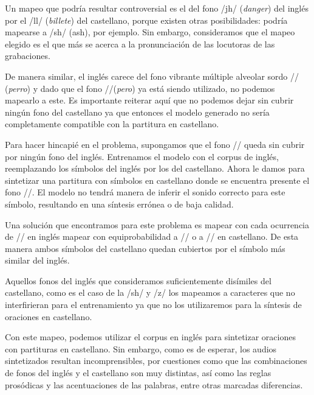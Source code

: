 Un mapeo que podría resultar controversial es el del fono /jh/ (\textit{danger}) del inglés por el /ll/ (\textit{billete}) del castellano, porque existen otras posibilidades: podría mapearse a /sh/ (ash), por ejemplo. Sin embargo, consideramos que el mapeo elegido es el que más se acerca a la pronunciación de las locutoras de las grabaciones.

De manera similar, el inglés carece del fono vibrante múltiple alveolar sordo // (\textit{perro}) y dado que el fono //(\textit{pero})  ya está siendo utilizado, no podemos mapearlo a este. Es importante reiterar aquí que no podemos dejar sin cubrir ningún fono del castellano ya que entonces el modelo generado no sería completamente compatible con la partitura en castellano. 

Para hacer hincapié en el problema, supongamos que el fono // queda sin cubrir por ningún fono del inglés. Entrenamos el modelo con el corpus de inglés, reemplazando los símbolos del inglés por los del castellano. Ahora le damos para sintetizar una partitura con símbolos en castellano donde se encuentra presente el fono //. El modelo no tendrá manera de inferir el sonido correcto para este símbolo, resultando en una síntesis errónea o de baja calidad. 

Una solución que encontramos para este problema es mapear con cada ocurrencia de // en inglés mapear con equiprobabilidad a // o a // en castellano. De esta manera ambos símbolos del castellano quedan cubiertos por el símbolo más similar del inglés.

Aquellos fonos del inglés que consideramos suficientemente disímiles del castellano, como es el caso de la /sh/ y /z/ los mapeamos a caracteres que no interfirieran para el entrenamiento ya que no los utilizaremos para la síntesis de oraciones en castellano.

Con este mapeo, podemos utilizar el corpus en inglés para sintetizar oraciones con partituras en castellano. Sin embargo, como es de esperar, los audios sintetizados resultan incomprensibles, por cuestiones como que las combinaciones de fonos del inglés y el castellano son muy distintas, así como las reglas prosódicas y las acentuaciones de las palabras, entre otras marcadas diferencias.

